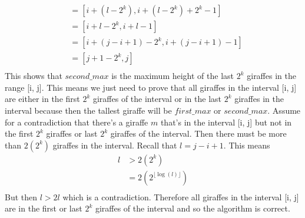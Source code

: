 \documentclass{article}
\begin{document}
\begin{enumerate}
\begin{enumerate}
\begin{align*}
        [i + remaining, i + remaining + 2^k - 1] &= [i + (l - 2^k), i + (l - 2^k) + 2^k - 1] \\
        &= [i + l - 2^k, i + l - 1] \\
        &= [i + (j - i+ 1) - 2^k, i + (j - i+ 1) - 1] \\
        &= [j + 1 - 2^k, j] \\
        \end{align*} This shows that $second\_max$ is the maximum height of the last $2^k$ giraffes in the range [i, j]. This means we just need to prove that all giraffes in the interval [i, j] are either in the first $2^k$ giraffes of the interval or in the last $2^k$ giraffes in the interval because then the tallest giraffe will be $first\_max$ or $second\_max$. Assume for a contradiction that there's a giraffe $m$ that's in the interval [i, j] but not in the first $2^k$ giraffes or last $2^k$ giraffes of the interval. Then there must be more than $2(2^k)$ giraffes in the interval. Recall that $l = j - i + 1$. This means \begin{align*}
    l  &> 2(2^{k})\\
    &= 2(2^{\lfloor \log(l)\rfloor})\\ 
   \end{align*}
    But then $l > 2l$ which is a contradiction. Therefore all giraffes in the interval [i, j] are in the first or last $2^k$ giraffes of the interval and so the algorithm is correct.
    

\end{enumerate}
\end{enumerate}
\end{document}

